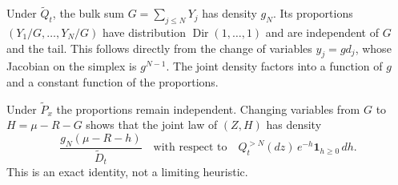 \documentclass[11pt,letterpaper]{article}
\numberwithin{equation}{section}
\theoremstyle{definition}
\theoremstyle{remark}
\newcommand{\ind}{\mathbf 1}
\newcommand{\Dir}{\operatorname{Dir}}
\begin{document}
Under $\widetilde Q_t$, the bulk sum $G=\sum_{j\le N}Y_j$ has density $g_N$.
Its proportions $(Y_1/G,\ldots,Y_N/G)$ have distribution
$\Dir(1,\ldots,1)$ and are independent of $G$ and the tail. This follows
directly from the change of variables $y_j=gd_j$, whose Jacobian on the
simplex is $g^{N-1}$. The joint density factors into a function of $g$ and a
constant function of the proportions.

Under $\widetilde P_x$ the proportions remain independent. Changing variables
from $G$ to $H=\mu-R-G$ shows that the joint law of $(Z,H)$ has density
\begin{equation}
 \frac{g_N(\mu-R-h)}{\widetilde D_t}
 \quad\text{with respect to}\quad
 Q_t^{>N}(dz)\,e^{-h}\ind_{h\ge0}\,dh.
 \label{eq:exactdisintegration}
\end{equation}
This is an exact identity, not a limiting heuristic.
\end{document}
